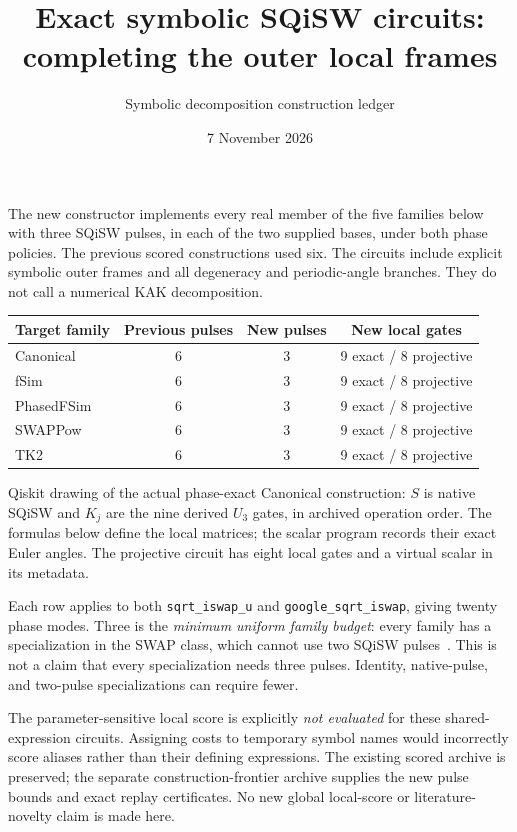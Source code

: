 \documentclass[11pt]{article}
\title{Exact symbolic SQiSW circuits: completing the outer local frames}
\author{Symbolic decomposition construction ledger}
\date{7 November 2026}
\begin{document}
\maketitle

\noindent The new constructor implements every real member of the five
families below with three SQiSW pulses, in each of the two supplied bases,
under both phase policies. The previous scored constructions used six.
The circuits include explicit symbolic outer frames and all degeneracy and
periodic-angle branches. They do not call a numerical KAK decomposition.
\begin{center}
\begin{tabular}{lccc}\toprule
Target family & Previous pulses & New pulses & New local gates\\\midrule
Canonical & 6 & 3 & 9 exact / 8 projective\\
fSim & 6 & 3 & 9 exact / 8 projective\\
PhasedFSim & 6 & 3 & 9 exact / 8 projective\\
SWAPPow & 6 & 3 & 9 exact / 8 projective\\
TK2 & 6 & 3 & 9 exact / 8 projective\\\bottomrule
\end{tabular}
\end{center}
\begin{center}
\resizebox{\linewidth}{!}{}
\end{center}
\noindent Qiskit drawing of the actual phase-exact Canonical construction:
$S$ is native SQiSW and $K_j$ are the nine derived $U_3$ gates, in archived
operation order. The formulas below define the local matrices; the scalar
program records their exact Euler angles. The projective circuit has eight
local gates and a virtual scalar in its metadata.

\noindent Each row applies to both \texttt{sqrt\_iswap\_u} and
\texttt{google\_sqrt\_iswap}, giving twenty phase modes. Three is the
\emph{minimum uniform family budget}: every family has a specialization in
the SWAP class, which cannot use two SQiSW pulses~\cite{sq}.
This is not a claim that every specialization needs three pulses.
Identity, native-pulse, and two-pulse specializations can require fewer.

The parameter-sensitive local score is explicitly \emph{not evaluated} for
these shared-expression circuits. Assigning costs to temporary symbol names
would incorrectly score aliases rather than their defining expressions.
The existing scored archive is preserved; the separate construction-frontier
archive supplies the new pulse bounds and exact replay certificates.
No new global local-score or literature-novelty claim is made here.
\end{document}
